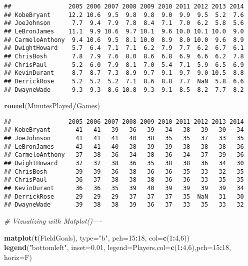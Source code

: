 \documentclass[
]{article}
\newenvironment{Shaded}{\begin{snugshade}}{\end{snugshade}}
\newcommand{\CommentTok}[1]{\textcolor[rgb]{0.56,0.35,0.01}{\textit{#1}}}
\newcommand{\DataTypeTok}[1]{\textcolor[rgb]{0.13,0.29,0.53}{#1}}
\newcommand{\DecValTok}[1]{\textcolor[rgb]{0.00,0.00,0.81}{#1}}
\newcommand{\FloatTok}[1]{\textcolor[rgb]{0.00,0.00,0.81}{#1}}
\newcommand{\KeywordTok}[1]{\textcolor[rgb]{0.13,0.29,0.53}{\textbf{#1}}}
\newcommand{\NormalTok}[1]{#1}
\newcommand{\OperatorTok}[1]{\textcolor[rgb]{0.81,0.36,0.00}{\textbf{#1}}}
\newcommand{\StringTok}[1]{\textcolor[rgb]{0.31,0.60,0.02}{#1}}
\begin{document}
\begin{verbatim}
##                2005 2006 2007 2008 2009 2010 2011 2012 2013 2014
## KobeBryant     12.2 10.6  9.5  9.8  9.8  9.0  9.9  9.5  5.2  7.6
## JoeJohnson      7.7  9.4  7.9  7.8  8.4  7.1  7.0  6.2  5.8  5.6
## LeBronJames    11.1  9.9 10.6  9.7 10.1  9.6 10.0 10.1 10.0  9.0
## CarmeloAnthony  9.4 10.6  9.5  8.1 10.0  8.9  8.0 10.0  9.6  8.9
## DwightHoward    5.7  6.4  7.1  7.1  6.2  7.9  7.7  6.2  6.7  6.1
## ChrisBosh       7.8  7.9  7.6  8.0  8.6  6.8  6.9  6.6  6.2  7.8
## ChrisPaul       5.2  6.0  7.9  8.1  7.0  5.4  7.1  5.9  6.5  6.9
## KevinDurant     8.7  8.7  7.3  8.9  9.7  9.1  9.7  9.0 10.5  8.8
## DerrickRose     5.2  5.2  5.2  7.1  8.6  8.8  7.7  NaN  5.8  6.6
## DwayneWade      9.3  9.3  8.6 10.8  9.3  9.1  8.5  8.2  7.7  8.2
\end{verbatim}

\begin{Shaded}
\begin{Highlighting}[]
\KeywordTok{round}\NormalTok{(MinutesPlayed}\OperatorTok{/}\NormalTok{Games)}
\end{Highlighting}
\end{Shaded}

\begin{verbatim}
##                2005 2006 2007 2008 2009 2010 2011 2012 2013 2014
## KobeBryant       41   41   39   36   39   34   38   39   30   34
## JoeJohnson       41   41   41   40   38   35   35   37   33   35
## LeBronJames      43   41   40   38   39   39   38   38   38   36
## CarmeloAnthony   37   38   36   34   38   36   34   37   39   36
## DwightHoward     37   37   38   36   35   38   38   36   34   30
## ChrisBosh        39   39   36   38   36   36   35   33   32   35
## ChrisPaul        36   37   38   38   38   36   36   33   35   35
## KevinDurant      36   36   35   39   40   39   39   39   39   34
## DerrickRose      29   29   29   37   37   37   35  NaN   31   30
## DwayneWade       39   38   38   39   36   37   33   35   33   32
\end{verbatim}

\begin{Shaded}
\begin{Highlighting}[]
\CommentTok{# Vizualizing with Matplot()----}

\KeywordTok{matplot}\NormalTok{(}\KeywordTok{t}\NormalTok{(FieldGoals), }\DataTypeTok{type=}\StringTok{"b"}\NormalTok{, }\DataTypeTok{pch=}\DecValTok{15}\OperatorTok{:}\DecValTok{18}\NormalTok{, }\DataTypeTok{col=}\KeywordTok{c}\NormalTok{(}\DecValTok{1}\OperatorTok{:}\DecValTok{4}\NormalTok{,}\DecValTok{6}\NormalTok{))}
\KeywordTok{legend}\NormalTok{(}\StringTok{"bottomleft"}\NormalTok{, }\DataTypeTok{inset=}\FloatTok{0.01}\NormalTok{, }\DataTypeTok{legend=}\NormalTok{Players,}\DataTypeTok{col=}\KeywordTok{c}\NormalTok{(}\DecValTok{1}\OperatorTok{:}\DecValTok{4}\NormalTok{,}\DecValTok{6}\NormalTok{),}\DataTypeTok{pch=}\DecValTok{15}\OperatorTok{:}\DecValTok{18}\NormalTok{, }\DataTypeTok{horiz=}\NormalTok{F)        }
\end{Highlighting}
\end{Shaded}
\end{document}
